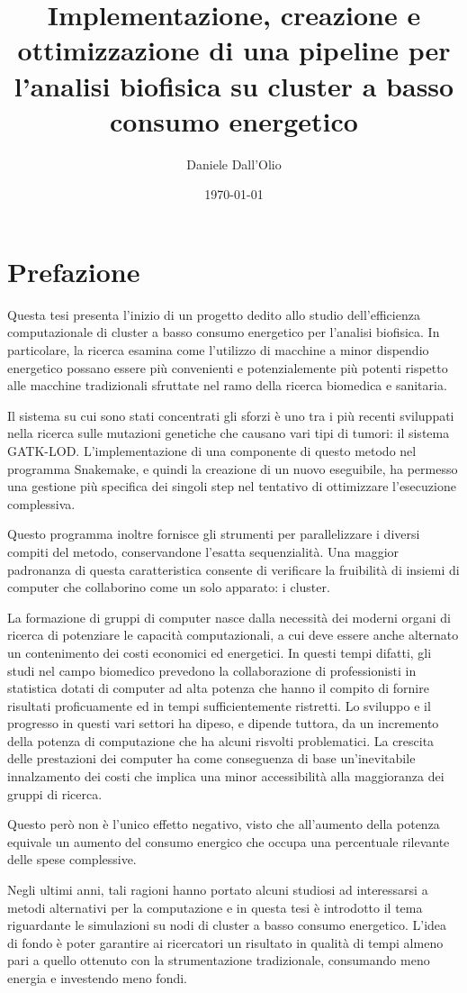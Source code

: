 \documentclass[12pt, a4paper]{report}
\title{Implementazione, creazione e ottimizzazione di una pipeline per l'analisi biofisica su cluster a basso consumo energetico}
\author{Daniele Dall'Olio}
\date{\today}
\begin{document}


\section*{Prefazione}
Questa tesi presenta l'inizio di un progetto dedito allo studio dell'efficienza computazionale di cluster a basso consumo energetico per l'analisi biofisica.
In particolare, la ricerca esamina come l'utilizzo di macchine a minor dispendio energetico possano essere più convenienti e potenzialemente più potenti rispetto alle macchine tradizionali sfruttate nel ramo della ricerca biomedica e sanitaria.


Il sistema su cui sono stati concentrati gli sforzi è uno tra i più recenti sviluppati nella ricerca sulle mutazioni genetiche che causano vari tipi di tumori: il sistema GATK-LOD.
L'implementazione di una componente di questo metodo nel programma Snakemake, e quindi la creazione di un nuovo eseguibile, ha permesso una gestione più specifica dei singoli step nel tentativo di ottimizzare l'esecuzione complessiva. 

Questo programma inoltre fornisce gli strumenti per parallelizzare i diversi compiti del metodo, conservandone l'esatta sequenzialità.
Una maggior padronanza di questa caratteristica consente di verificare la fruibilità di insiemi di computer che collaborino come un solo apparato: i cluster.

La formazione di gruppi di computer nasce dalla necessità dei moderni organi di ricerca di potenziare le capacità computazionali, a cui deve essere anche alternato un contenimento dei costi economici ed energetici.
In questi tempi difatti, gli studi nel campo biomedico prevedono la collaborazione di professionisti in statistica dotati di computer ad alta potenza che hanno il compito di fornire risultati proficuamente ed in tempi sufficientemente ristretti.
Lo sviluppo e il progresso in questi vari settori ha dipeso, e dipende tuttora, da un incremento della potenza di computazione che ha alcuni risvolti problematici.
La crescita delle prestazioni dei computer ha come conseguenza di base un'inevitabile innalzamento dei costi che implica una minor accessibilità alla maggioranza dei gruppi di ricerca.

Questo però non è l'unico effetto negativo, visto che all'aumento della potenza equivale un aumento del consumo energico che occupa una percentuale rilevante delle spese complessive.

Negli ultimi anni, tali ragioni hanno portato alcuni studiosi ad interessarsi a metodi alternativi per la computazione e in questa tesi è introdotto il tema riguardante le simulazioni su nodi di cluster a basso consumo energetico.
L'idea di fondo è poter garantire ai ricercatori un risultato in qualità di tempi almeno pari a quello ottenuto con la strumentazione tradizionale, consumando meno energia e investendo meno fondi.
\end{document}

